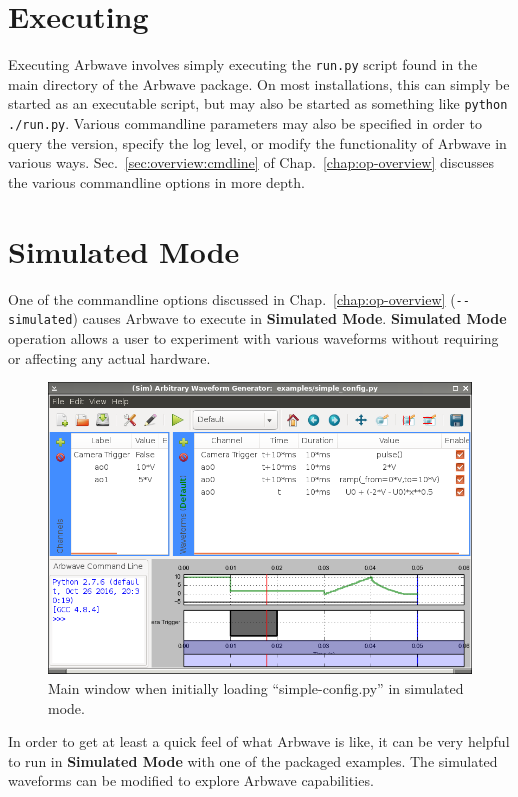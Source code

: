 \thispagestyle{fancy}
\pagestyle{fancy}


\section{Executing}\label{sec:quick:exec}
Executing Arbwave involves simply executing the \verb|run.py| script found in
the main directory of the Arbwave package.  On most installations, this can
simply be started as an executable script, but may also be started as something
like \verb|python ./run.py|.  Various commandline parameters may also be
specified in order to query the version, specify the log level, or modify the
functionality of Arbwave in various ways.  Sec.~\ref{sec:overview:cmdline} of
Chap.~\ref{chap:op-overview} discusses the various commandline options in
more depth.


\section{Simulated Mode}
One of the commandline options discussed in Chap.~\ref{chap:op-overview}
(\verb|--simulated|)
causes Arbwave to execute in \textbf{Simulated Mode}.  \textbf{Simulated Mode}
operation allows a user to experiment with various waveforms without requiring
or affecting any actual hardware.

\begin{figure}[htb!]
  \centerline{\includegraphics[width=.8\textwidth]{figures/main-simple-config}}
  \caption{Main window when initially loading ``simple-config.py'' in simulated
  mode.}
  \label{fig:quick:main-simple-config}
\end{figure}


In order to get at least a quick feel of what Arbwave is like, it can be very
helpful to run in \textbf{Simulated Mode} with one of the packaged examples.  The
simulated waveforms can be modified to explore Arbwave capabilities.

